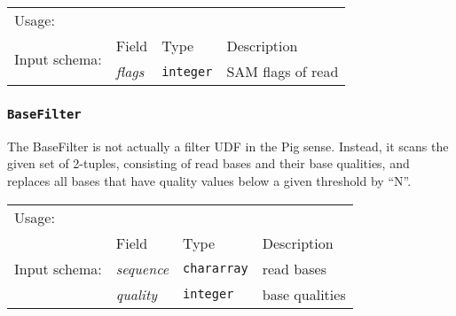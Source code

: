 \begin{tabular}{lp{}p{}p{}}
Usage: & \multicolumn{3}{l}{}
\hspace*{-0.55cm}\begin{minipage}{0.85\textwidth}
  \begin{lstlisting}
  DEFINE ReadUnmapped SAMFlagsFilter('HasSegmentUnmapped');
  reads = load 'input.bam' using BamLoader('yes');
  mapped_reads = FILTER reads BY not ReadUnmapped(flags);
  \end{lstlisting}
  \end{minipage}\hfill\kern-\arrayrulewidth
 \\[0.25cm]
\multirow{2}{*}{Input schema:} & Field & Type & Description\\[0.1cm]
& \emph{flags} & \texttt{integer} & SAM flags of read
\end{tabular}

\subsubsection{\texttt{BaseFilter}}

The BaseFilter is not actually a filter UDF in the Pig sense. Instead,
it scans the given set of 2-tuples, consisting of read bases and their
base qualities, and replaces all bases that have quality values below
a given threshold by ``N''.

\begin{tabular}{lp{}p{}p{}}
Usage: & \multicolumn{3}{l}{}
\hspace*{-0.55cm}\begin{minipage}{0.85\textwidth}
  \begin{lstlisting}
  DEFINE baseFilter BaseFilter('50');
  reads = LOAD 'input.fq' USING FastqLoader();
  reads_filtered = FOREACH reads GENERATE instrument, run_number, flow_cell_id,
      lane, tile, xpos, ypos, read, qc_passed, control_number, index_sequence,
      FLATTEN(baseFilter(sequence, quality));
  \end{lstlisting}
  \end{minipage}\hfill\kern-\arrayrulewidth
 \\[0.25cm]
\multirow{3}{*}{Input schema:} & Field & Type & Description\\[0.1cm]
& \emph{sequence} & \texttt{chararray} & read bases\\
& \emph{quality} & \texttt{integer} & base qualities
\end{tabular}\hfill

